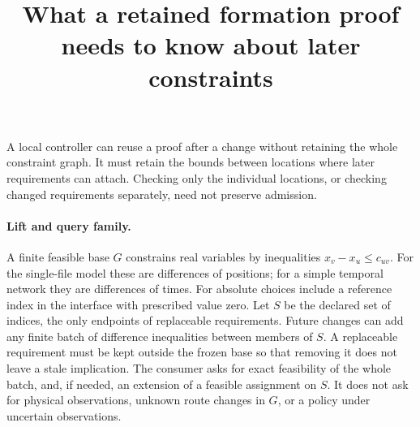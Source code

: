 \documentclass[11pt]{article}
\title{What a retained formation proof needs to know about later constraints}
\begin{document}
\maketitle

A local controller can reuse a proof after a change without retaining the
whole constraint graph. It must retain the bounds between locations where
later requirements can attach. Checking only the individual locations, or
checking changed requirements separately, need not preserve admission.

\paragraph{Lift and query family.}
A finite feasible base \(G\) constrains real variables by inequalities
\(x_v-x_u\le c_{uv}\). For the single-file model these are differences
of positions; for a simple temporal network they are differences of
times. For absolute choices include a reference index in the interface
with prescribed value zero. Let \(S\) be the
declared set of indices, the only endpoints of replaceable requirements.
Future changes can add any finite batch of difference inequalities
between members of \(S\). A replaceable requirement must be kept outside
the frozen base so that removing it does not leave a stale implication.
The consumer asks for exact feasibility of the whole batch, and, if
needed, an extension of a feasible assignment on \(S\). It does not ask
for physical observations, unknown route changes in \(G\), or a policy
under uncertain observations.
\end{document}
